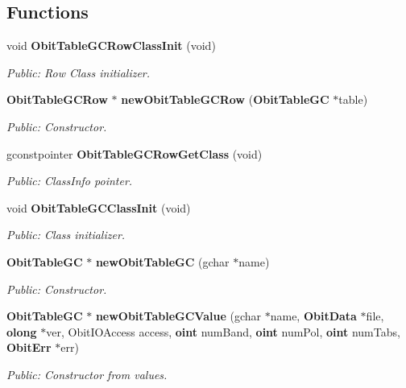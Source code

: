 \subsection*{Functions}
\begin{CompactItemize}
\item 
void {\bf Obit\-Table\-GCRow\-Class\-Init} (void)
\begin{CompactList}\small\item\em Public: Row Class initializer. \item\end{CompactList}\item 
{\bf Obit\-Table\-GCRow} $\ast$ {\bf new\-Obit\-Table\-GCRow} ({\bf Obit\-Table\-GC} $\ast$table)
\begin{CompactList}\small\item\em Public: Constructor. \item\end{CompactList}\item 
gconstpointer {\bf Obit\-Table\-GCRow\-Get\-Class} (void)
\begin{CompactList}\small\item\em Public: Class\-Info pointer. \item\end{CompactList}\item 
void {\bf Obit\-Table\-GCClass\-Init} (void)
\begin{CompactList}\small\item\em Public: Class initializer. \item\end{CompactList}\item 
{\bf Obit\-Table\-GC} $\ast$ {\bf new\-Obit\-Table\-GC} (gchar $\ast$name)
\begin{CompactList}\small\item\em Public: Constructor. \item\end{CompactList}\item 
{\bf Obit\-Table\-GC} $\ast$ {\bf new\-Obit\-Table\-GCValue} (gchar $\ast$name, {\bf Obit\-Data} $\ast$file, {\bf olong} $\ast$ver, Obit\-IOAccess access, {\bf oint} num\-Band, {\bf oint} num\-Pol, {\bf oint} num\-Tabs, {\bf Obit\-Err} $\ast$err)
\begin{CompactList}\small\item\em Public: Constructor from values. \item\end{CompactList}\item 

\end{CompactItemize}

